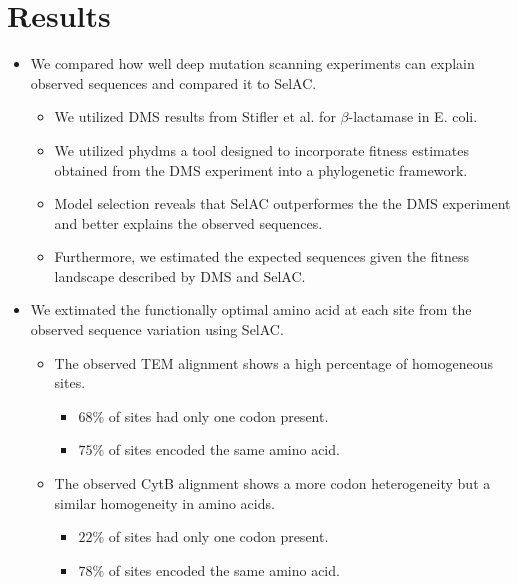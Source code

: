 \documentclass[12pt]{article}
\begin{document}
\section*{Results}
\begin{itemize}
	\item We compared how well deep mutation scanning experiments can explain observed sequences and compared it to SelAC.
	\begin{itemize}
		\item We utilized DMS results from Stifler et al. for $\beta$-lactamase in E. coli. 
		\item We utilized phydms a tool designed to incorporate fitness estimates obtained from the DMS experiment into a phylogenetic framework.
		\item Model selection reveals that SelAC outperformes the the DMS experiment and better explains the observed sequences.
		\item Furthermore, we estimated the expected sequences given the fitness landscape described by DMS and SelAC.
	\end{itemize}
	\item We extimated the functionally optimal amino acid at each site from the observed sequence variation using SelAC.
	\begin{itemize}
		\item The observed TEM alignment shows a high percentage of homogeneous sites.
		\begin{itemize} 
			\item $68 \%$ of sites had only one codon present.
			\item $75 \%$ of sites encoded the same amino acid.
		\end{itemize}
		\item The observed CytB alignment shows a more codon heterogeneity but a similar homogeneity in amino acids.
		\begin{itemize} 
			\item $22 \%$ of sites had only one codon present.
			\item $78 \%$ of sites encoded the same amino acid.
		\end{itemize}

\end{itemize}
\end{itemize}
\end{document}
